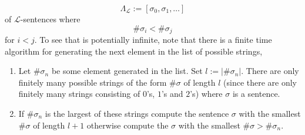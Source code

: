 $$\Lambda_\mathcal{L}:=[\sigma_0,\sigma_1,\dots]$$
of $\mathcal{L}$-sentences where 
$$\#\sigma_i <\#\sigma_j$$
for $i<j$. To see that is potentially infinite, note that there is a finite time algorithm for generating the next element in the list of possible strings,
\begin{enumerate}
    \item Let $\#\sigma_n$ be some element generated in the list. Set $l:= \vert\#\sigma_n\vert$. There are only finitely many possible strings of the form $\#\sigma$ of length $l$ (since there are only finitely many strings consisting of $0$'s, $1$'s and $2$'s) where $\sigma$ is a sentence. 
    \item If $\#\sigma_n$ is the largest of these strings compute the sentence $\sigma$ with the smallest $\#\sigma$ of length $l+1$ otherwise compute the $\sigma$ with the smallest $\#\sigma>\#\sigma_n$.  
\end{enumerate}
